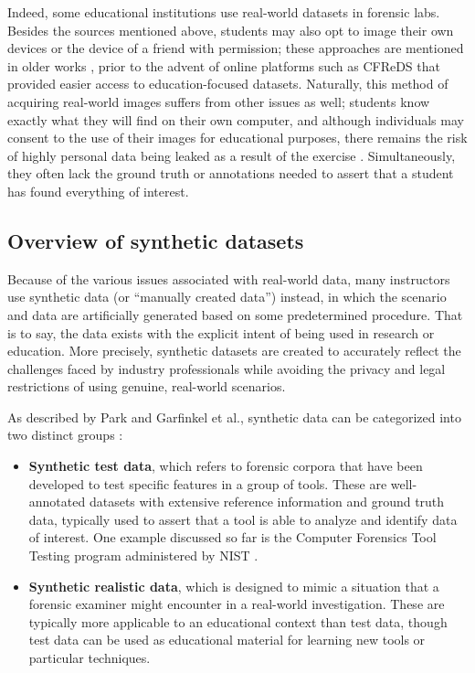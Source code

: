 \documentclass[letterpaper,12pt]{report}
\def\tightlist{}
\begin{document}
Indeed, some educational institutions use real-world datasets in
forensic labs. Besides the sources mentioned above, students may also
opt to image their own devices or the device of a friend with
permission; these approaches are mentioned in older works
\cite{andersonComparativeStudyTeaching2006,mochForensicImageGenerator2009},
prior to the advent of online platforms such as CFReDS that provided
easier access to education-focused datasets. Naturally, this method of
acquiring real-world images suffers from other issues as well; students
know exactly what they will find on their own computer, and although
individuals may consent to the use of their images for educational
purposes, there remains the risk of highly personal data being leaked as
a result of the exercise \cite{garfinkelBringingScienceDigital2009}.
Simultaneously, they often lack the ground truth or annotations needed
to assert that a student has found everything of interest.

\subsection{Overview of synthetic
datasets}\label{overview-of-synthetic-datasets}

Because of the various issues associated with real-world data, many
instructors use synthetic data (or ``manually created data'') instead,
in which the scenario and data are artificially generated based on some
predetermined procedure. That is to say, the data exists with the
explicit intent of being used in research or education. More precisely,
synthetic datasets are created to accurately reflect the challenges
faced by industry professionals while avoiding the privacy and legal
restrictions of using genuine, real-world scenarios.

As described by Park and Garfinkel et al., synthetic data can be
categorized into two distinct groups
\cite{garfinkelBringingScienceDigital2009,parkTREDEVMPOPCultivating2018}:

\begin{itemize}
\tightlist
\item
  \textbf{Synthetic test data}, which refers to forensic corpora that
  have been developed to test specific features in a group of tools.
  These are well-annotated datasets with extensive reference information
  and ground truth data, typically used to assert that a tool is able to
  analyze and identify data of interest. One example discussed so far is
  the Computer Forensics Tool Testing program administered by NIST
  \cite{nationalinstituteofstandardsandtechnologyComputerForensicsTool2017}.
\item
  \textbf{Synthetic realistic data}, which is designed to mimic a
  situation that a forensic examiner might encounter in a real-world
  investigation. These are typically more applicable to an educational
  context than test data, though test data can be used as educational
  material for learning new tools or particular techniques.
\end{itemize}
\end{document}
